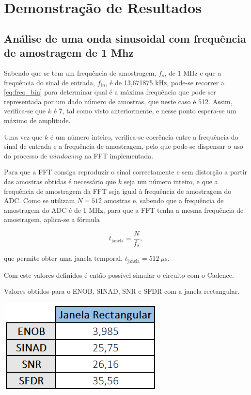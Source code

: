 \documentclass[11pt]{article}
\numberwithin{equation}{section}
\begin{document}
\section{Demonstração de Resultados}

\subsection{Análise de uma onda sinusoidal com frequência de amostragem de 1 Mhz}

Sabendo que se tem um frequência de amostragem, $f_{s}$, de 1 MHz e que a frequência do sinal de entrada, $f_{in}$, é de 13,671875 kHz, pode-se recorrer a \ref{eq:freq_bin} para determinar qual é a máxima frequência que pode ser representada por um dado número de amostras, que neste caso é 512. Assim, verifica-se que $k$ é 7, tal como visto anteriormente, e nesse ponto espera-se um máximo de amplitude.

Uma vez que $k$ é um número inteiro, verifica-se coerência entre a frequência do sinal de entrada e a frequência de amostragem, pelo que pode-se dispensar o uso do processo de $windowing$ na FFT implementada.

Para que a FFT consiga reproduzir o sinal correctamente e sem distorção a partir das amostras obtidas é necessário que $k$ seja um número inteiro, e que a frequência de amostragem da FFT seja igual à frequência de amostragem do ADC. Como se utilizam $N = 512$ amostras e, sabendo que a frequência de amostragem do ADC é de $1$ MHz, para que a FFT tenha a mesma frequência de amostragem, aplica-se a fórmula 

\vspace{-3mm}
\begin{equation}
 	t_{\text{janela}} = \frac{N}{f_{s}},
 	\label{eq:temp_jan}
\end{equation}

\vspace{1mm}
que permite obter uma janela temporal, $t_{\text{janela}} = 512~\mu$s.

Com este valores definidos é então possível simular o circuito com o Cadence.

\begin{table}[h]
	\centering
	\caption{Valores obtidos para o ENOB, SINAD, SNR e SFDR com a janela rectangular.}
 	\includegraphics[keepaspectratio=true, scale=0.50]{lab/rect.png}
\end{table}
\end{document}
